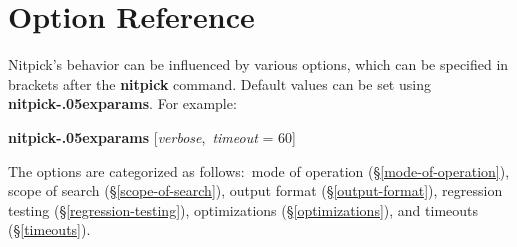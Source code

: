 \documentclass[a4paper,12pt]{article}
\renewcommand\_{\hbox{\textunderscore\kern-.05ex}}
\begin{document}
\section{Option Reference}
\label{option-reference}

\def\defl{\{}
\def\defr{\}}

\def\flushitem#1{\item[]\noindent\kern-\leftmargin \textbf{#1}}
\def\qty#1{$\left<\textit{#1}\right>$}
\def\qtybf#1{$\mathbf{\left<\textbf{\textit{#1}}\right>}$}
\def\optrue#1#2{\flushitem{\textit{#1} $\bigl[$= \qtybf{bool}$\bigr]$\enskip \defl\textit{true}\defr\hfill (neg.: \textit{#2})}\nopagebreak\\[\parskip]}
\def\opfalse#1#2{\flushitem{\textit{#1} $\bigl[$= \qtybf{bool}$\bigr]$\enskip \defl\textit{false}\defr\hfill (neg.: \textit{#2})}\nopagebreak\\[\parskip]}
\def\opsmart#1#2{\flushitem{\textit{#1} $\bigl[$= \qtybf{smart\_bool}$\bigr]$\enskip \defl\textit{smart}\defr\hfill (neg.: \textit{#2})}\nopagebreak\\[\parskip]}
\def\opnodefault#1#2{\flushitem{\textit{#1} = \qtybf{#2}} \nopagebreak\\[\parskip]}
\def\opdefault#1#2#3{\flushitem{\textit{#1} = \qtybf{#2}\enskip \defl\textit{#3}\defr} \nopagebreak\\[\parskip]}
\def\oparg#1#2#3{\flushitem{\textit{#1} \qtybf{#2} = \qtybf{#3}} \nopagebreak\\[\parskip]}
\def\opargbool#1#2#3{\flushitem{\textit{#1} \qtybf{#2} $\bigl[$= \qtybf{bool}$\bigr]$\hfill (neg.: \textit{#3})}\nopagebreak\\[\parskip]}
\def\opargboolorsmart#1#2#3{\flushitem{\textit{#1} \qtybf{#2} $\bigl[$= \qtybf{smart\_bool}$\bigr]$\hfill (neg.: \textit{#3})}\nopagebreak\\[\parskip]}

Nitpick's behavior can be influenced by various options, which can be specified
in brackets after the \textbf{nitpick} command. Default values can be set
using \textbf{nitpick\_\allowbreak params}. For example:

\prew
\textbf{nitpick\_params} [\textit{verbose}, \,\textit{timeout} = 60]
\postw

The options are categorized as follows:\ mode of operation
(\S\ref{mode-of-operation}), scope of search (\S\ref{scope-of-search}), output
format (\S\ref{output-format}), regression testing (\S\ref{regression-testing}),
optimizations (\S\ref{optimizations}), and timeouts (\S\ref{timeouts}).
\end{document}
